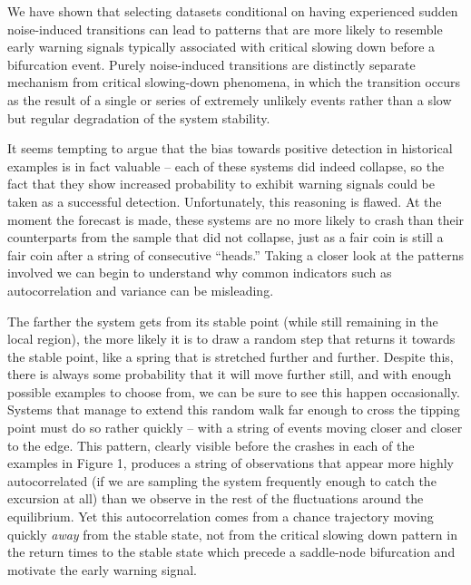 \documentclass[authoryear,review,12pt]{elsarticle}
\begin{document}
We have shown that selecting datasets conditional on having experienced sudden 
noise-induced transitions can lead to patterns that are more likely to resemble
early warning signals typically associated with critical slowing down before 
a bifurcation event.  Purely noise-induced transitions are distinctly separate 
mechanism from critical slowing-down phenomena, in which the transition occurs
as the result of a single or series of extremely unlikely events rather than
a slow but regular degradation of the system stability.  


It seems tempting to argue that the bias towards positive detection in historical
examples is in fact valuable -- each of these systems did indeed collapse, so the fact that they show increased 
probability to exhibit warning signals could be taken as a successful detection.
Unfortunately, this reasoning is flawed. At the moment the forecast is made,
these systems are no more likely to crash than their counterparts from the sample
that did not collapse, just as a fair coin is still a fair coin after a string of
consecutive ``heads.''  Taking a closer look at the patterns involved we can
begin to understand why common indicators such as autocorrelation and variance
can be misleading.


The farther the system gets from its stable point (while still 
remaining in the local region), the more likely it is to draw a random step 
that returns it towards the stable point, like a spring that is stretched 
further and further. Despite this, there is always some probability that it will 
move further still, and with enough possible examples to choose from, we
can be sure to see this happen occasionally.  
Systems that manage to extend this random walk far enough to cross the
tipping point must do so rather quickly -- with a string of events moving 
closer and closer to the edge.  This pattern, clearly visible before the 
crashes in each of the examples in Figure 1, produces a string of observations
that appear more highly autocorrelated (if we are sampling the system
frequently enough to catch the excursion at all) than we observe in the rest
of the fluctuations around the equilibrium.  Yet this autocorrelation comes from
a chance trajectory moving quickly \emph{away} from the stable state, not from
the critical slowing down pattern in the return times to the stable state
which precede a saddle-node bifurcation and motivate the early warning signal.
\end{document}
